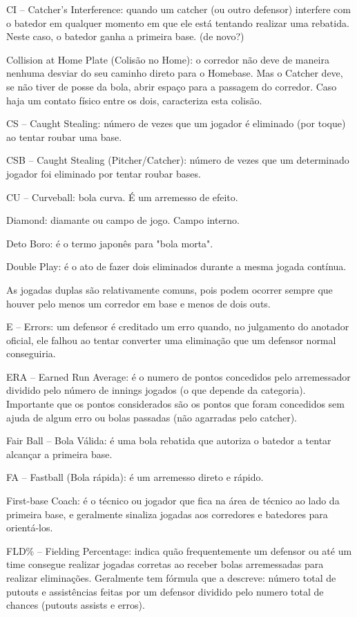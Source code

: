 CI -- Catcher's Interference: quando um catcher (ou outro defensor) interfere com o batedor em qualquer momento em que ele está tentando realizar uma
rebatida. Neste caso, o batedor ganha a primeira base. (de novo?)

Collision at Home Plate (Colisão no Home): o corredor não deve de maneira nenhuma desviar do seu caminho direto para o Homebase. Mas o Catcher deve,
se não tiver de posse da bola, abrir espaço para a passagem do corredor. Caso haja um contato físico entre os dois, caracteriza esta colisão.

CS -- Caught Stealing: número de vezes que um jogador é eliminado (por toque) ao tentar roubar uma base.

CSB -- Caught Stealing (Pitcher/Catcher): número de vezes que um determinado jogador foi eliminado por tentar roubar bases.

CU -- Curveball: bola curva. É um arremesso de efeito.

Diamond: diamante ou campo de jogo. Campo interno.

Deto Boro: é o termo japonês para "bola morta".

Double Play: é o ato de fazer dois eliminados durante a mesma jogada contínua.

As jogadas duplas são relativamente comuns, pois podem ocorrer sempre que houver pelo menos um corredor em base e menos de dois outs.


E -- Errors: um defensor é creditado um erro quando, no julgamento do anotador oficial, ele falhou ao tentar converter uma eliminação que um defensor normal conseguiria.

ERA -- Earned Run Average: é o numero de pontos concedidos pelo arremessador dividido pelo número de innings jogados (o que depende da categoria). Importante que os pontos considerados são os pontos que foram concedidos sem ajuda de algum erro ou bolas passadas (não agarradas pelo catcher).

Fair Ball -- Bola Válida: é uma bola rebatida que autoriza o batedor a tentar alcançar a primeira base.

FA -- Fastball (Bola rápida): é um arremesso direto e rápido.

First-base Coach: é o técnico ou jogador que fica na área de técnico ao lado da primeira base, e geralmente sinaliza jogadas aos corredores e batedores para orientá-los.

FLD\% -- Fielding Percentage: indica quão frequentemente um defensor ou até um time consegue realizar jogadas corretas ao receber bolas arremessadas para realizar eliminações. Geralmente tem fórmula que a descreve: número total de putouts e assistências feitas por um defensor dividido pelo numero total de chances (putouts assists e erros).




